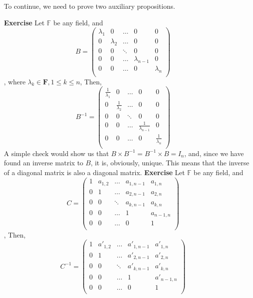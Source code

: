 \documentclass[12pt]{article}
\begin{document}
To continue, we need to prove two auxiliary propositions. \newline

\textbf{Exercise} \newline
Let $\mathbb{F}$ be any field, and $$
B=\begin{pmatrix} 
	\lambda_1 & 0 & \dots & 0 & 0 \\
	0 & \lambda_2 & \dots & 0 & 0 \\
	0 & 0 & \ddots & 0 & 0 \\
	0 & 0 & \dots & \lambda_{n-1} & 0 \\
	0 & 0 & \dots & 0 & \lambda_n \\
	\end{pmatrix}
	\quad
$$, 
where $\lambda_k \in \mathbf{F},1 \leq k \leq n$, Then, \newline
$$
B^{-1}=\begin{pmatrix} 
	\frac{1}{\lambda_1} & 0 & \dots & 0 & 0 \\
	0 & \frac{1}{\lambda_2} & \dots & 0 & 0 \\
	0 & 0 & \ddots & 0 & 0 \\
	0 & 0 & \dots & \frac{1}{\lambda_{n-1}} & 0 \\
	0 & 0 & \dots & 0 & \frac{1}{\lambda_n} \\
	\end{pmatrix}
	\quad
$$
A simple check would show us that $B \times B^{-1}=B^{-1} \times B=I_n$, and, since we have found an inverse matrix to $B$, it is, obviously, unique. \newline
This means that the inverse of a diagonal matrix is also a diagonal matrix. \newline
\newline
\textbf{Exercise} \newline
Let $\mathbb{F}$ be any field, and $$
C=\begin{pmatrix} 
	1 & a_{1,2} & \dots & a_{1,n-1} & a_{1,n} \\
	0 & 1 & \dots & a_{2,n-1} & a_{2,n} \\
	0 & 0 & \ddots & a_{k,n-1} & a_{k,n} \\
	0 & 0 & \dots & 1 & a_{n-1,n} \\
	0 & 0 & \dots & 0 & 1 \\
	\end{pmatrix}
	\quad
 $$, Then, \newline
 $$
C^{-1}=\begin{pmatrix} 
	1 & a'_{1,2} & \dots & a'_{1,n-1} & a'_{1,n} \\
	0 & 1 & \dots & a'_{2,n-1} & a'_{2,n} \\
	0 & 0 & \ddots & a'_{k,n-1} & a'_{k,n} \\
	0 & 0 & \dots & 1 & a'_{n-1,n} \\
	0 & 0 & \dots & 0 & 1 \\
	\end{pmatrix}
	\quad
 $$
\end{document}
